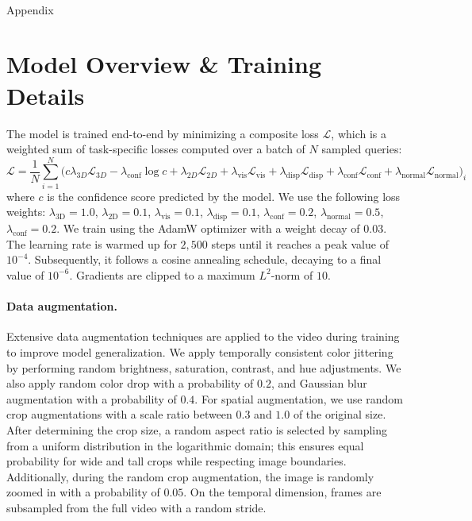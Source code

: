 \appendix

\onecolumn
{
\centering
\Large
\textbf{\thetitle}\\
\vspace{0.5em}Appendix \\
\vspace{1.0em}
}


\section{Model Overview \& Training Details}
\label{sec:app:overview}


\noindent The model is trained end-to-end by minimizing a composite loss $\mathcal{L}$, which is a weighted sum of task-specific losses computed over a batch of $N$ sampled queries:
\begin{equation*}
\mathcal{L} = \frac{1}{N} \sum_{i=1}^{N} \Big( 
    c\lambda_{3D}\mathcal{L}_{3D} 
    - \lambda_{\text{conf}}\log{c}
    + \lambda_{2D}\mathcal{L}_{2D}
    + \lambda_{\text{vis}}\mathcal{L}_{\text{vis}} 
    + \lambda_{\text{disp}}\mathcal{L}_{\text{disp}} 
    + \lambda_{\text{conf}}\mathcal{L}_{\text{conf}} 
    + \lambda_{\text{normal}}\mathcal{L}_{\text{normal}}
\Big)_i
\end{equation*}
where $c$ is the confidence score predicted by the model.
We use the following loss weights:
$\lambda_{\scriptscriptstyle \mathrm{3D}}{=}1.0$, $\lambda_{\scriptscriptstyle \mathrm{2D}}{=}0.1$, $\lambda_{\text{vis}}{=}0.1$, $\lambda_{\text{disp}}{=}0.1$,  $\lambda_{\text{conf}}{=}0.2$, $\lambda_{\text{normal}}{=}0.5$,  $\lambda_{\text{conf}}{=}0.2$.
We train using the AdamW optimizer with a weight decay of $0.03$.
The learning rate is warmed up for $2{,}500$ steps until it reaches a peak value of $10^{-4}$. 
Subsequently, it follows a cosine annealing schedule, decaying to a final value of $10^{-6}$. 
Gradients are clipped to a maximum ${L}^2$-norm of $10$.

\paragraph{Data augmentation.}
Extensive data augmentation techniques are applied to the video during training to improve model generalization.
We apply temporally consistent color jittering by performing random brightness, saturation, contrast, and hue adjustments. We also apply random color drop with a probability of $0.2$, and Gaussian blur augmentation with a probability of $0.4$. 
For spatial augmentation, we use random crop augmentations with a scale ratio between $0.3$ and $1.0$ of the original size. 
After determining the crop size, a random aspect ratio is selected by sampling from a uniform distribution in the logarithmic domain; this ensures equal probability for wide and tall crops while respecting image boundaries. 
Additionally, during the random crop augmentation, the image is randomly zoomed in with a probability of $0.05$.
On the temporal dimension, frames are subsampled from the full video with a random stride. 

